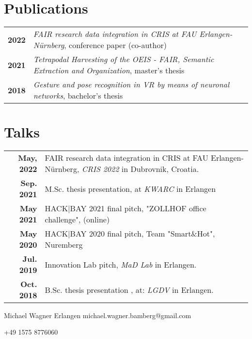\documentclass[michiscolours]{hipstercv}
\newlength{\rightcolwidth}
\begin{document}
\begin{paracol}{2}
\begin{minipage}[t]{0.3\textwidth}
\section*{Publications}
\begin{tabular}{>{\footnotesize\bfseries}r >{\footnotesize}p{}}
   2022 &\emph{FAIR research data integration in CRIS at FAU Erlangen-Nürnberg}, conference paper (co-author) \\
    2021 & \emph{Tetrapodal Harvesting of the OEIS - FAIR, Semantic Extraction and Organization}, master's thesis \\
    2018 & \emph{Gesture and pose recognition in VR by means of neuronal networks}, bachelor's thesis 
\end{tabular}
\section*{Talks}
\begin{tabular}{>{\footnotesize\bfseries}r >{\footnotesize}p{}}
   May, 2022& FAIR research data integration in CRIS at FAU Erlangen-Nürnberg, \emph{CRIS 2022} in Dubrovnik, Croatia. \\
    Sep. 2021& M.Sc. thesis presentation, at \emph{KWARC} in Erlangen \\
    May 2021& HACK|BAY 2021 final pitch, "ZOLLHOF office challenge",  (online) \\
    May 2020& HACK|BAY 2020 final pitch, Team "Smart\&Hot", Nuremberg \\
    Jul. 2019& Innovation Lab pitch, \emph{MaD Lab} in Erlangen.\\
    Oct. 2018& B.Sc. thesis presentation , at: \emph{LGDV} in Erlangen. \\
\end{tabular}
\end{minipage}


\vfill{} %
\setlength{\parindent}{0pt}
\begin{minipage}[t]{\rightcolwidth}
\begin{center}\fontfamily{\sfdefault}\selectfont \color{black!70}
{
\small Michael Wagner 
 Erlangen 
 michael.wagner.bamberg@gmail.com \newline 

 +49 1575 8776060 
}
\end{center}
\end{minipage}

\newpage

\end{paracol}
\end{document}

